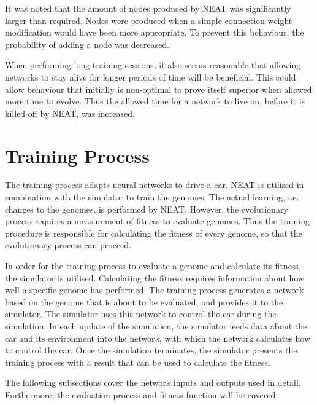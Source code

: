 It was noted that the amount of nodes produced by NEAT was significantly larger than required. Nodes were produced when a simple connection weight modification would have been more appropriate. To prevent this behaviour, the probability of adding a node was decreased.

When performing long training sessions, it also seems reasonable that allowing networks to stay alive for longer periods of time will be beneficial. This could allow behaviour that initially is non-optimal to prove itself superior when allowed more time to evolve. Thus the allowed time for a network to live on, before it is killed off by NEAT, was increased.



\section{Training Process}
The training process adapts neural networks to drive a car. NEAT is utilised in combination with the simulator to train the genomes. The actual learning, i.e. changes to the genomes, is performed by NEAT. However, the evolutionary process requires a measurement of fitness to evaluate genomes. Thus the training procedure is responsible for calculating the fitness of every genome, so that the evolutionary process can proceed. 

In order for the training process to evaluate a genome and calculate its fitness, the simulator is utilised. Calculating the fitness requires information about how well a specific genome has performed. The training process generates a network based on the genome that is about to be evaluated, and provides it to the simulator. The simulator uses this network to control the car during the simulation. In each update of the simulation, the simulator feeds data about the car and its environment into the network, with which the network calculates how to control the car. Once the simulation terminates, the simulator presents the training process with a result that can be used to calculate the fitness.

The following subsections cover the network inputs and outputs used in detail. Furthermore, the evaluation process and fitness function will be covered. 

